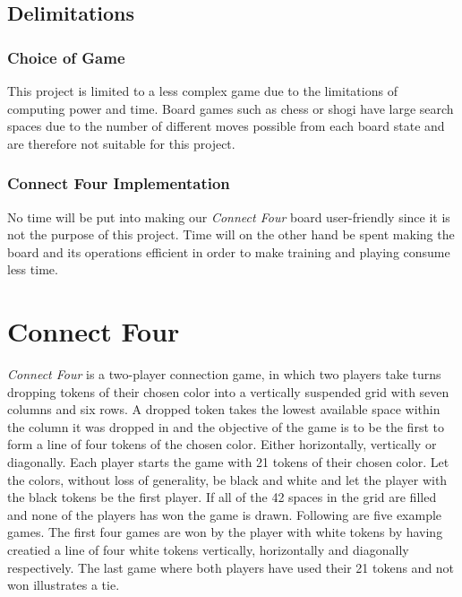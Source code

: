 \documentclass[titlepage]{article}
\begin{document}
\subsection{Delimitations}

\vskip 0.2cm

\subsubsection{Choice of Game}
This project is limited to a less complex game due to the limitations of computing power and time. Board games such as chess or shogi have large search spaces due to the number of different moves possible from each board state and are therefore not suitable for this project. 

\subsubsection{Connect Four Implementation}
No time will be put into making our \emph{Connect Four} board user-friendly since it is not the purpose of this project. Time will on the other hand be spent making the board and its operations efficient in order to make training and playing consume less time. 

\newpage

\section{Connect Four}

\vskip 0.5cm

\emph{Connect Four} is a two-player connection game, in which two players take turns dropping tokens of their chosen color into a vertically suspended grid with seven columns and six rows. A dropped token takes the lowest available space within the column it was dropped in and the objective of the game is to be the first to form a line of four tokens of the chosen color. Either horizontally, vertically or diagonally. Each player starts the game with 21 tokens of their chosen color. Let the colors, without loss of generality, be black and white and let the player with the black tokens be the first player. If all of the 42 spaces in the grid are filled and none of the players has won the game is drawn. Following are five example games. The first four games are won by the player with white tokens by having creatied a line of four white tokens vertically, horizontally and diagonally respectively. The last game where both players have used their 21 tokens and not won illustrates a tie.
\end{document}
